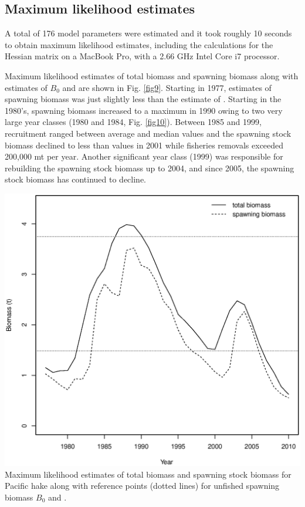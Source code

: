 \begin{multicols}{2}
\subsection{Maximum likelihood estimates}
A total of 176 model parameters were estimated and it took  roughly 10 seconds to obtain maximum likelihood estimates, including the calculations for the Hessian matrix on a MacBook Pro, with a 2.66 GHz Intel Core i7 processor.

Maximum likelihood estimates of total biomass and spawning biomass along with estimates of $B_0$ and \bmsy are shown in Fig. \ref{fig9}.  Starting in 1977, estimates of spawning biomass was just slightly less than the estimate of \bmsy.  Starting in the 1980's, spawning biomass increased to a maximum in 1990 owing to two very large year classes (1980 and 1984, Fig. \ref{fig10}). Between 1985 and 1999, recruitment ranged between average and median values and the spawning stock biomass declined to less than \bmsy values in 2001 while fisheries removals exceeded 200,000 mt per year.  Another significant year class (1999) was responsible for rebuilding the spawning stock biomass up to 2004, and since 2005, the spawning stock biomass has continued to decline.

\begin{figurehere}
	\centering
	\includegraphics[width=0.95\columnwidth]{iscamFigs/phakefig2.eps}\\
	\caption{Maximum likelihood estimates of total biomass and spawning stock biomass for Pacific hake along with reference points (dotted lines) for unfished spawning biomass $B_0$ and \bmsy.}\label{fig9}
\end{figurehere}


\end{multicols}
